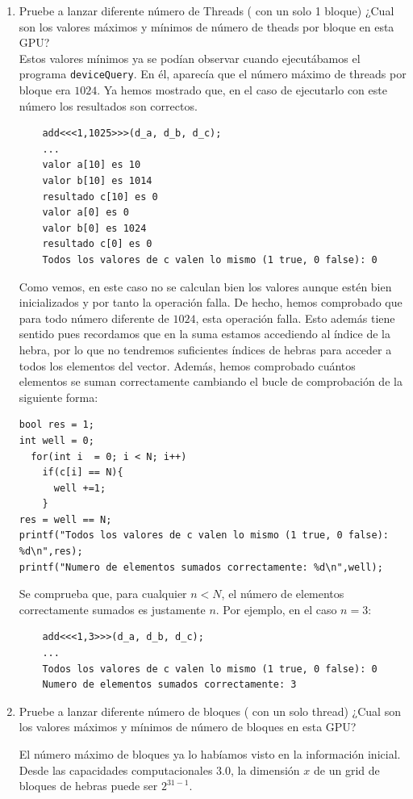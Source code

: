 \documentclass[11pt]{article}
\def\inline{\lstinline[basicstyle=\ttfamily,keywordstyle={}]}
\theoremstyle{plain}
\begin{document}
\begin{enumerate}

\item Pruebe a lanzar diferente número de Threads ( con un solo 1 bloque)
  ¿Cual son los valores máximos y mínimos de número de theads por bloque en esta GPU?\\

  Estos valores mínimos ya se podían observar cuando ejecutábamos el programa \inline{deviceQuery}. En él, aparecía que el número máximo de threads por bloque era $1024$. Ya hemos mostrado que, en el caso de ejecutarlo con este número los resultados son correctos.

  \begin{verbatim}
	add<<<1,1025>>>(d_a, d_b, d_c);
	... 
	valor a[10] es 10
 	valor b[10] es 1014
	resultado c[10] es 0
 	valor a[0] es 0
 	valor b[0] es 1024
	resultado c[0] es 0
	Todos los valores de c valen lo mismo (1 true, 0 false): 0
  \end{verbatim}
Como vemos, en este caso no se calculan bien los valores aunque estén bien inicializados y por tanto la operación falla. De hecho, hemos comprobado que para todo número diferente de $1024$, esta operación falla. Esto además tiene sentido pues recordamos que en la suma estamos accediendo al índice de la hebra, por lo que no tendremos suficientes índices de hebras para acceder a todos los elementos del vector. Además, hemos comprobado cuántos elementos se suman correctamente cambiando el bucle de comprobación de la siguiente forma:
\begin{verbatim}
bool res = 1;
int well = 0;
  for(int i  = 0; i < N; i++)
    if(c[i] == N){
      well +=1;
    }
res = well == N;
printf("Todos los valores de c valen lo mismo (1 true, 0 false): %d\n",res);
printf("Numero de elementos sumados correctamente: %d\n",well);
\end{verbatim}
Se comprueba que, para cualquier $n < N$, el número de elementos correctamente sumados es justamente $n$. Por ejemplo, en el caso $n=3$:
\begin{verbatim}
	add<<<1,3>>>(d_a, d_b, d_c);
	... 
   	Todos los valores de c valen lo mismo (1 true, 0 false): 0
   	Numero de elementos sumados correctamente: 3
\end{verbatim} 
  \item Pruebe a lanzar diferente número de bloques ( con un solo thread) ¿Cual son los valores máximos y mínimos de número de bloques en esta GPU?

		El número máximo de bloques ya lo habíamos visto en la información inicial. Desde las capacidades computacionales $3.0$, la dimensión $x$ de un grid de bloques de hebras puede ser $2^{31-1}$.
\end{enumerate}
\end{document}
